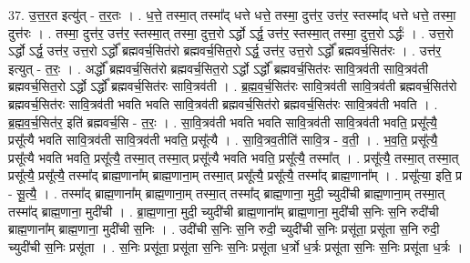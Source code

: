 \documentclass[17pt]{extarticle}
\begin{document}
37. उ॒त्त॒र॒त इत्यु॑त् - त॒र॒तः । . ध॒त्ते॒ तस्मा॒त् तस्मा᳚द् धत्ते धत्ते॒ तस्मा॒ दुत्त॑र॒ उत्त॑र॒ स्तस्मा᳚द् धत्ते धत्ते॒ तस्मा॒ दुत्त॑रः । . तस्मा॒ दुत्त॑र॒ उत्त॑र॒ स्तस्मा॒त् तस्मा॒ दुत्त॒रो ऽर्द्धो ऽर्द्ध॒ उत्त॑र॒ स्तस्मा॒त् तस्मा॒ दुत्त॒रो ऽर्द्धः॑ । . उत्त॒रो ऽर्द्धो ऽर्द्ध॒ उत्त॑र॒ उत्त॒रो ऽर्द्धो᳚ ब्रह्मवर्च॒सित॑रो ब्रह्मवर्च॒सित॒रो ऽर्द्ध॒ उत्त॑र॒ उत्त॒रो ऽर्द्धो᳚ ब्रह्मवर्च॒सित॑रः । . उत्त॑र॒ इत्युत् - त॒रः॒ । . अर्द्धो᳚ ब्रह्मवर्च॒सित॑रो ब्रह्मवर्च॒सित॒रो ऽर्द्धो ऽर्द्धो᳚ ब्रह्मवर्च॒सित॑रः सावि॒त्रव॑ती सावि॒त्रव॑ती ब्रह्मवर्च॒सित॒रो ऽर्द्धो ऽर्द्धो᳚ ब्रह्मवर्च॒सित॑रः सावि॒त्रव॑ती । . ब्र॒ह्म॒व॒र्च॒सित॑रः सावि॒त्रव॑ती सावि॒त्रव॑ती ब्रह्मवर्च॒सित॑रो ब्रह्मवर्च॒सित॑रः सावि॒त्रव॑ती भवति भवति सावि॒त्रव॑ती ब्रह्मवर्च॒सित॑रो ब्रह्मवर्च॒सित॑रः सावि॒त्रव॑ती भवति । . ब्र॒ह्म॒व॒र्च॒सित॑र॒ इति॑ ब्रह्मवर्च॒सि - त॒रः॒ । . सा॒वि॒त्रव॑ती भवति भवति सावि॒त्रव॑ती सावि॒त्रव॑ती भवति॒ प्रसू᳚त्यै॒ प्रसू᳚त्यै भवति सावि॒त्रव॑ती सावि॒त्रव॑ती भवति॒ प्रसू᳚त्यै । . सा॒वि॒त्रव॒तीति॑ सावि॒त्र - व॒ती॒ । . भ॒व॒ति॒ प्रसू᳚त्यै॒ प्रसू᳚त्यै भवति भवति॒ प्रसू᳚त्यै॒ तस्मा॒त् तस्मा॒त् प्रसू᳚त्यै भवति भवति॒ प्रसू᳚त्यै॒ तस्मा᳚त् । . प्रसू᳚त्यै॒ तस्मा॒त् तस्मा॒त् प्रसू᳚त्यै॒ प्रसू᳚त्यै॒ तस्मा᳚द् ब्राह्म॒णाना᳚म् ब्राह्म॒णाना॒म् तस्मा॒त् प्रसू᳚त्यै॒ प्रसू᳚त्यै॒ तस्मा᳚द् ब्राह्म॒णाना᳚म् । . प्रसू᳚त्या॒ इति॒ प्र - सू॒त्यै॒ । . तस्मा᳚द् ब्राह्म॒णाना᳚म् ब्राह्म॒णाना॒म् तस्मा॒त् तस्मा᳚द् ब्राह्म॒णाना॒ मुदी॒ च्युदी॑ची ब्राह्म॒णाना॒म् तस्मा॒त् तस्मा᳚द् ब्राह्म॒णाना॒ मुदी॑ची । . ब्रा॒ह्म॒णाना॒ मुदी॒ च्युदी॑ची ब्राह्म॒णाना᳚म् ब्राह्म॒णाना॒ मुदी॑ची स॒निः स॒नि रुदी॑ची ब्राह्म॒णाना᳚म् ब्राह्म॒णाना॒ मुदी॑ची स॒निः । . उदी॑ची स॒निः स॒नि रुदी॒ च्युदी॑ची स॒निः प्रसू॑ता॒ प्रसू॑ता स॒नि रुदी॒ च्युदी॑ची स॒निः प्रसू॑ता । . स॒निः प्रसू॑ता॒ प्रसू॑ता स॒निः स॒निः प्रसू॑ता ध॒र्त्रो ध॒र्त्रः प्रसू॑ता स॒निः स॒निः प्रसू॑ता ध॒र्त्रः । \newline
\end{document}
